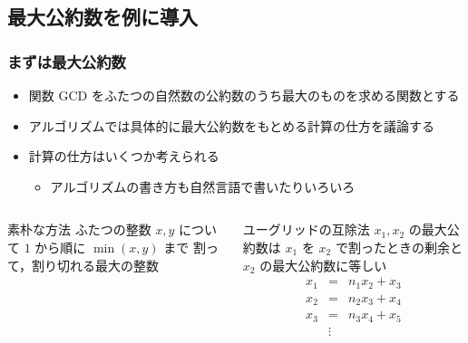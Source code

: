 \subsection{最大公約数を例に導入}
\begin{frame}
\frametitle{まずは最大公約数}
  \begin{itemize}
\item 関数 GCD をふたつの自然数の公約数のうち最大のものを求める関数とする
\item アルゴリズムでは具体的に最大公約数をもとめる計算の仕方を議論する
\item 計算の仕方はいくつか考えられる
    \begin{itemize}
\item アルゴリズムの書き方も自然言語で書いたりいろいろ
    \end{itemize}
  \end{itemize}
  \begin{columns}[t]
    \begin{column}{0.5\textwidth}
      \begin{block}{素朴な方法}
ふたつの整数 \(x, y\) について $1$ から順に \(\min(x,y)\) まで
割って，割り切れる最大の整数
      \end{block}
    \end{column}
    \begin{column}{0.5\textwidth}
      \begin{block}{ユーグリッドの互除法}
\scriptsize
\(x_1, x_2\) の最大公約数は $x_1$ を $x_2$ で割ったときの剰余と $x_2$ の最大公約数に等しい
        \begin{displaymath}
          \begin{array}{rcl}
x_1 &=& n_1 x_2 + x_3\\
x_2 &=& n_2 x_3 + x_4\\
x_3 &=& n_3 x_4 + x_5\\
&\vdots&
          \end{array}
        \end{displaymath}
      \end{block}
    \end{column}
  \end{columns}
\end{frame}
